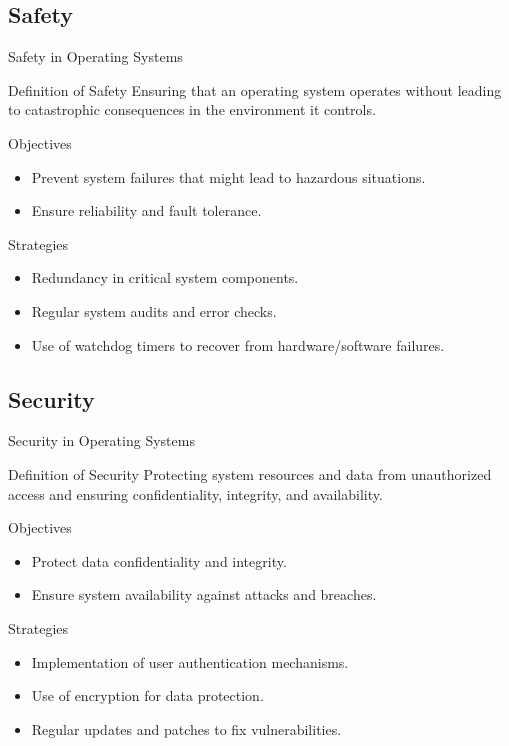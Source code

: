 \documentclass[10pt]{beamer}
\begin{document}
    \subsection{Safety}
    \begin{frame}{Safety in Operating Systems}
      \begin{block}{Definition of Safety}
          Ensuring that an operating system operates without leading to catastrophic consequences in the environment it controls.
      \end{block}
      \begin{block}{Objectives}
          \begin{itemize}
              \item Prevent system failures that might lead to hazardous situations.
              \item Ensure reliability and fault tolerance.
          \end{itemize}
      \end{block}
      \begin{block}{Strategies}
          \begin{itemize}
              \item Redundancy in critical system components.
              \item Regular system audits and error checks.
              \item Use of watchdog timers to recover from hardware/software failures.
          \end{itemize}
      \end{block}
  \end{frame}
  \subsection{Security}
  \begin{frame}{Security in Operating Systems}
    \begin{block}{Definition of Security}
        Protecting system resources and data from unauthorized access and ensuring confidentiality, integrity, and availability.
    \end{block}
    \begin{block}{Objectives}
        \begin{itemize}
            \item Protect data confidentiality and integrity.
            \item Ensure system availability against attacks and breaches.
        \end{itemize}
    \end{block}
    \begin{block}{Strategies}
        \begin{itemize}
            \item Implementation of user authentication mechanisms.
            \item Use of encryption for data protection.
            \item Regular updates and patches to fix vulnerabilities.
        \end{itemize}
    \end{block}
\end{frame}
\end{document}
